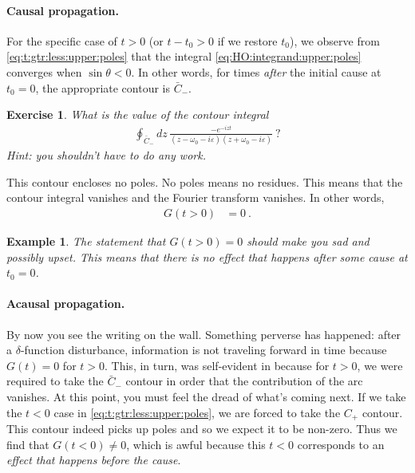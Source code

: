 \documentclass[
  11pt,
	colorful,
	raggedright,
]{tufte-style-thesis-flip}
\newtheorem{exercise}{Exercise}[section]
\newtheorem{example}{Example}[section]
\begin{document}
\paragraph{Causal propagation.}
For the specific case of $t>0$ (or $t-t_0>0$ if we restore $t_0$), we observe from \eqref{eq:t:gtr:less:upper:poles} that the integral \eqref{eq:HO:integrand:upper:poles} converges when $\sin\theta <0$. In other words, for times \emph{after} the initial cause at $t_0=0$, the appropriate contour is $\bar C_-$. 
\begin{exercise}
What is the value of the contour integral 
\begin{align}
  \oint_{\bar{C}_-} dz\, \frac{-e^{-i z t}}{(z - \omega_0 - i\varepsilon)(z + \omega_0 - i\varepsilon)} \ ?
\end{align}
Hint: you shouldn't have to do any work.
\end{exercise}
This contour encloses no poles. No poles means no residues. This means that the contour integral vanishes and the Fourier transform vanishes. In other words, 
\begin{align}
  G(t>0) &= 0 \ .
  \label{eq:HO:G:t:gtr:0:zero}
\end{align}

\begin{example}
The statement that $G(t>0)=0$ should make you sad and possibly upset. This means that there is \emph{no} effect that happens after some cause at $t_0=0$.
\end{example}

\paragraph{Acausal propagation.} By now you see the writing on the wall. Something perverse has happened: after a $\delta$-function disturbance, information is not traveling forward in time because $G(t)=0$ for $t>0$. This, in turn, was self-evident in because for $t>0$, we were required to take the $\bar C_-$ contour in order that the contribution of the arc vanishes. At this point, you must feel the dread of what's coming next. If we take the $t<0$ case in \eqref{eq:t:gtr:less:upper:poles}, we are forced to take the $C_+$ contour. This contour indeed picks up poles and so we expect it to be non-zero. Thus we find that $G(t<0) \neq 0$, which is awful because this $t<0$ corresponds to an \emph{effect that happens before the cause}. 
\end{document}
